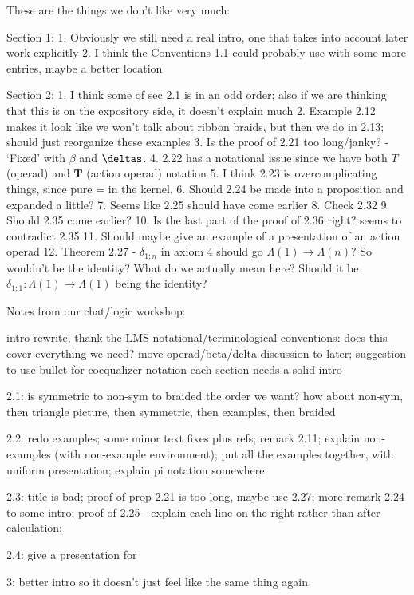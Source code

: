 These are the things we don't like very much:

Section 1:
1. Obviously we still need a real intro, one that takes into account later work explicitly
2. I think the Conventions 1.1 could probably use with some more entries, maybe a better location

Section 2:
1. I think some of sec 2.1 is in an odd order; also if we are thinking that this is on the expository side, it doesn't explain much
2. Example 2.12 makes it look like we won't talk about ribbon braids, but then we do in 2.13; should just reorganize these examples
3. Is the proof of 2.21 too long/janky? - `Fixed' with $\beta$ and $\deltas$.
4. 2.22 has a notational issue since we have both $T$ (operad) and $\mathbf{T}$ (action operad) notation
5. I think 2.23 is overcomplicating things, since pure = in the kernel.
6. Should 2.24 be made into a proposition and expanded a little?
7. Seems like 2.25 should have come earlier
8. Check 2.32
9. Should 2.35 come earlier?
10. Is the last part of the proof of 2.36 right? seems to contradict 2.35
11. Should maybe give an example of a presentation of an action operad 
12. Theorem 2.27 - $\delta_{1;n}$ in axiom 4 should go $\Lambda(1) \rightarrow \Lambda(n)$? So wouldn't be the identity? What do we actually mean here? Should it be $\delta_{1;1} \colon \Lambda(1) \rightarrow \Lambda(1)$ being the identity?


Notes from our chat/logic workshop:

intro rewrite, thank the LMS 
notational/terminological conventions: does this cover everything we need? move operad/beta/delta discussion to later; suggestion to use bullet for coequalizer notation
each section needs a solid intro

2.1: is symmetric to non-sym to braided the order we want? how about non-sym, then triangle picture, then symmetric, then examples, then braided

2.2: redo examples; some minor text fixes plus refs; remark 2.11; explain non-examples (with non-example environment); put all the examples together, with uniform presentation; explain pi notation somewhere

2.3: title is bad; proof of prop 2.21 is too long, maybe use 2.27; more remark 2.24 to some intro; proof of 2.25 - explain each line on the right rather than after calculation; 

2.4: give a presentation for \Sigma

3: better intro so it doesn't just feel like the same thing again

